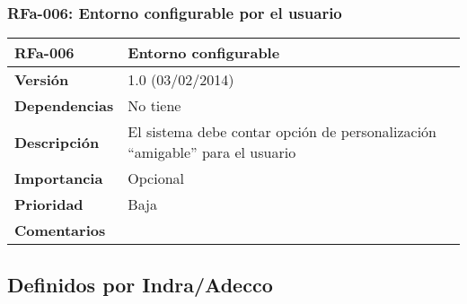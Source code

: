 \subsubsection*{RFa-006: Entorno configurable por el usuario}
\begin{tabular}{|p{3cm}|p{11.5cm}|}
\hline
\textbf{RFa-006}        & \textbf{Entorno configurable}                                                                              \\ \hline
\textbf{Versión}        & 1.0 (03/02/2014)                                                                                           \\ \hline
\textbf{Dependencias}   & No tiene                                                                                                   \\ \hline
\textbf{Descripción}    & El sistema debe contar opción de personalización ``amigable'' para el usuario                              \\ \hline
\textbf{Importancia}    & Opcional                                                                                                   \\ \hline
\textbf{Prioridad}      & Baja                                                                                                       \\ \hline
\textbf{Comentarios}    &                                                                                                            \\ \hline
\end{tabular}


\subsection*{Definidos por Indra/Adecco}
